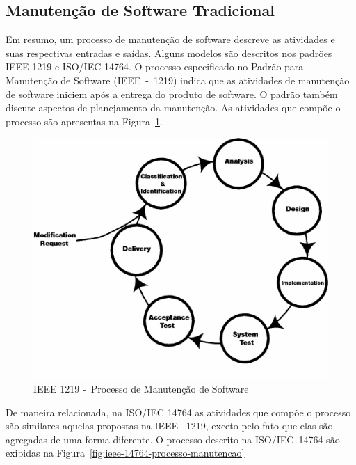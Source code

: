 \subsection{Manutenção de Software Tradicional}
\label{subsec:manutenção_de_software_tradicional}

Em resumo, um processo de manutenção de software descreve as atividades e suas
respectivas entradas e saídas. Alguns modelos são descritos nos padrões IEEE
1219 e ISO/IEC 14764. O processo especificado no Padrão para Manutenção de
Software (IEEE~-~1219) indica que as atividades de manutenção de software iniciem
após a entrega do produto de software. O padrão também discute aspectos de
planejamento da manutenção. As atividades que compõe o processo são apresentas
na Figura~\ref{fig:ieee-1219-processo-man-software}.

\begin{figure}[htpb] \centering
	\includegraphics[width=0.7\linewidth]
	{chapter-manutencao-software-visao-geral/img/ieee-1219-98-processo-manutencao.png}
	\caption{IEEE 1219 -~Processo de Manutenção de Software}\label{fig:ieee-1219-processo-man-software}
\end{figure}

De maneira relacionada, na ISO/IEC 14764 as atividades que compõe o processo são
similares aquelas propostas na IEEE-~1219, exceto pelo fato que elas são
agregadas de uma forma diferente. O processo descrito na ISO/IEC~14764 são
exibidas na Figura~\ref{fig:ieee-14764-processo-manutencao}

